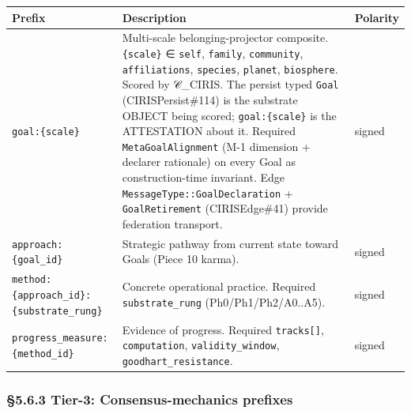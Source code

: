\documentclass[11pt]{article}
\begin{document}
{\footnotesize
\begin{longtable}{|p{5.33cm}|p{5.33cm}|p{5.33cm}|}\hline
\textbf{Prefix} & \textbf{Description} & \textbf{Polarity} \\ \hline\endhead
\texttt{goal:\{scale\}} & Multi-scale belonging-projector composite. \texttt{\{scale\}} ∈ \texttt{self}, \texttt{family}, \texttt{community}, \texttt{affiliations}, \texttt{species}, \texttt{planet}, \texttt{biosphere}. Scored by 𝒞\_CIRIS. The persist typed \texttt{Goal} (CIRISPersist\#114) is the substrate OBJECT being scored; \texttt{goal:\{scale\}} is the ATTESTATION about it. Required \texttt{MetaGoalAlignment} (M-1 dimension + declarer rationale) on every Goal as construction-time invariant. Edge \texttt{MessageType::GoalDeclaration} + \texttt{GoalRetirement} (CIRISEdge\#41) provide federation transport. & signed \\ \hline
\texttt{approach:\{goal\_id\}} & Strategic pathway from current state toward Goals (Piece 10 karma). & signed \\ \hline
\texttt{method:\{approach\_id\}:\{substrate\_rung\}} & Concrete operational practice. Required \texttt{substrate\_rung} (Ph0/Ph1/Ph2/A0..A5). & signed \\ \hline
\texttt{progress\_measure:\{method\_id\}} & Evidence of progress. Required \texttt{tracks[]}, \texttt{computation}, \texttt{validity\_window}, \texttt{goodhart\_resistance}. & signed \\ \hline
\end{longtable}}


\subsubsection*{§5.6.3 Tier-3: Consensus-mechanics prefixes}
\end{document}
